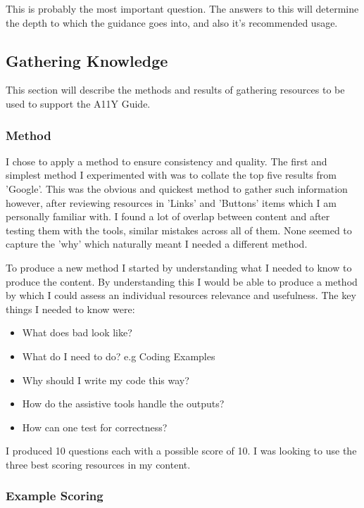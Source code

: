 This is probably the most important question. The answers to this will
determine the depth to which the guidance goes into, and also it's
recommended usage.

\subsection{Gathering Knowledge}
\label{sec:GatheringKnowledge}
This section will describe the methods and results of gathering resources to
be used to support the A11Y Guide.

\subsubsection{Method}
I chose to apply a method to ensure consistency and quality. The first and
simplest method I experimented with was to collate the top five results from
'Google'. This was the obvious and quickest method to gather such information
however, after reviewing resources in 'Links' and 'Buttons' items which I am
personally familiar with. I found a lot of overlap between content and after
testing them with the tools, similar mistakes across all of them.
None seemed to capture the 'why' which naturally meant I needed a
different method.

To produce a new method I started by understanding what I needed to know to
produce the content. By understanding this I would be able to produce a method
by which I could assess an individual resources relevance and usefulness. The
key things I needed to know were:

\begin {itemize}
\item What does bad look like?
\item What do I need to do? e.g Coding Examples
\item Why should I write my code this way?
\item How do the assistive tools handle the outputs?
\item How can one test for correctness?
\end{itemize}

I produced 10 questions each with a possible score of 10. I was looking to
use the three best scoring resources in my content.

\subsubsection{Example Scoring}


